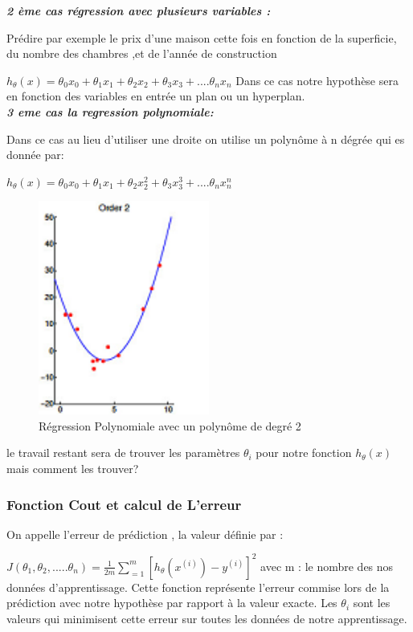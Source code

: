 \textbf{\emph{2 ème cas régression avec plusieurs variables :}}

 Prédire par exemple le prix d'une maison cette fois en fonction de la superficie, du nombre des chambres ,et de l'année de construction

${h}_{\theta}\left(x\right)={\theta }_{0}{x}_{0}+{\theta }_{1}{x}_{1}+{\theta }_{2}{x}_{2}+{\theta }_{3}{x}_{3}+....{\theta }_{n}{x}_{n}$
Dans ce cas notre hypothèse sera en fonction des variables en entrée un plan ou un hyperplan.\\

\textbf{\emph{3 eme cas la regression polynomiale:}}

Dans ce cas au lieu d'utiliser une droite on utilise un polynôme à n dégrée qui es donnée par:

${h}_{\theta}\left(x\right)={\theta }_{0}{x}_{0}+{\theta }_{1}{x}_{1}+{\theta }_{2}{x}_{2}^{2}+{\theta }_{3}{x}_{3}^{3}+....{\theta }_{n}{x}_{n}^{n}$
\begin{figure}[ht]
	\centering
	\includegraphics[width=0.5\textwidth]{fig/regressionPlokynome.png}
	\caption{Régression Polynomiale avec un polynôme de degré 2}
	\label{fig:image2}
\end{figure}
le travail restant sera de trouver les paramètres ${\theta }_{i}$ pour notre fonction  ${h}_{\theta}\left(x\right)$ mais comment les trouver?

\subsubsection{Fonction Cout et calcul de L'erreur }
On appelle l'erreur de prédiction , la valeur définie par   :

 $J\left({\theta }_{1},{\theta }_{2},.....{\theta }_{n}\right)=\frac{1}{2m}\sum _{=1}^{m}{\left[{h}_{\theta}\left({x}^{(i)}\right) - {y}^{(i)}\right]}^2$
 avec m : le nombre des nos données d'apprentissage.
 Cette fonction représente l'erreur commise lors de la prédiction avec notre hypothèse par rapport à la valeur exacte.
 Les  ${\theta }_{i}$ sont les valeurs qui minimisent cette erreur sur toutes les données de notre apprentissage.
 
